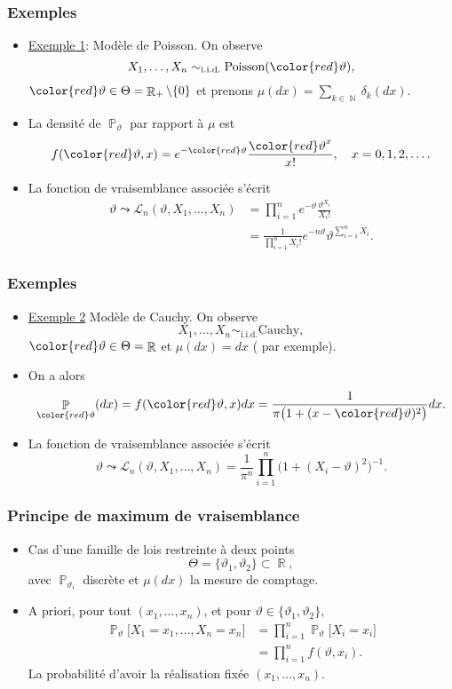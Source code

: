 ﻿\documentclass{beamer}
\DeclareMathOperator{\R}{{\mathbb R}}
\DeclareMathOperator{\N}{{\mathbb N}}
\DeclareMathOperator{\PP}{{\mathbb P}}
\begin{document}
\begin{frame}
\frametitle{Exemples}
\begin{itemize}
\item \underline{Exemple 1}: {\color{red}Modèle de Poisson}. On observe
$$X_1,\ldots, X_n \sim_{\text{i.i.d.}}\text{Poisson}({\color{red}\vartheta}),$$
${\color{red}\vartheta} \in \Theta = \R_+\setminus \{0\}$ et prenons
$\mu(dx) = \sum_{k \in \N}\delta_k(dx)$.
\item La densit\'e de $\PP_\vartheta$ par rapport \`a $\mu$ est
$$f({\color{red}\vartheta}, x) = e^{-{\color{red}\vartheta}}
\frac{{\color{red}\vartheta}^x}{x!}, \quad x=0,1,2,\dots.$$
\item La {\color{red} fonction de vraisemblance} associée s'écrit
\begin{align*}
\vartheta \leadsto {\mathcal L}_n(\vartheta, X_1,\ldots, X_n)
&= \prod_{i = 1}^n e^{-\vartheta}\frac{\vartheta^{X_i}}{X_i!} \\
&= \frac{1}{\prod_{i = 1}^nX_i!} e^{-n\vartheta} \vartheta^{\sum_{i = 1}^n X_i}.
\end{align*}
\end{itemize}
\end{frame}

\begin{frame}
\frametitle{Exemples}
\begin{itemize}
\item \underline{Exemple 2} {\color{red}Mod\`ele de Cauchy}. On observe
$$X_1,\ldots, X_n \sim_{\text{i.i.d.}}\text{Cauchy},$$
${\color{red}\vartheta} \in \Theta = \R$ et $\mu(dx)=dx$ ({\color{red} par exemple}).
\item On a alors
$$\PP_{\color{red}\vartheta}(dx)=f({\color{red}\vartheta},x)dx=\frac{1}{\pi\big(1+(x-{\color{red}\vartheta})^2\big)}dx.$$
\item La {\color{red} fonction de vraisemblance} associée s'écrit
$$\vartheta \leadsto {\mathcal L}_n(\vartheta, X_1,\ldots, X_n) = \frac{1}{\pi^n}\prod_{i = 1}^n \big(1+(X_i-\vartheta)^2\big)^{-1}.$$
\end{itemize}
\end{frame}

\begin{frame}
\frametitle{Principe de maximum de vraisemblance}
\begin{itemize}
\item Cas d'une famille de lois {\color{red} restreinte à deux points}
$$\Theta  = \{\vartheta_1,\vartheta_2\} \subset \R,$$
avec $\PP_{\vartheta_i}$ discrète et $\mu(dx)$ la mesure de comptage.
\item {\color{red}A priori}, pour tout $(x_1,\ldots, x_n)$, et pour $\vartheta \in \{\vartheta_1,\vartheta_2\}$,
\begin{align*}
\PP_\vartheta\big[X_1=x_1,\ldots, X_n=x_n\big] & = \prod_{i=1}^n \PP_\vartheta\big[X_i=x_i\big] \\
&=\prod_{i = 1}^nf(\vartheta, x_i).
\end{align*}
La probabilit\'e d'avoir la r\'ealisation fix\'ee $(x_1,\ldots,
x_n)$.
\end{itemize}
\end{frame}
\end{document}
